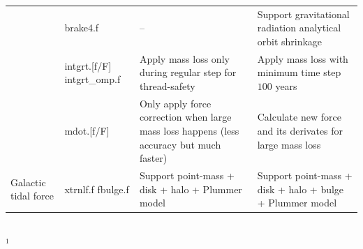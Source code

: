 \documentclass[usenatbib,aas_macros]{mn2e}
\begin{document}
\begin{table}
\begin{tabular}{p{0.8in}|p{0.8in}|p{2.1in}|p{2.1in}}
                       & brake4.f & -- & Support gravitational radiation analytical orbit shrinkage\\
                       & intgrt.[f/F] intgrt\_omp.f 
                       & Apply mass loss only during regular step for thread-safety
                       & Apply mass loss with minimum time step $100$ years\\
                       & mdot.[f/F] 
                       & Only apply force correction when large mass loss happens (less accuracy but much faster)
                       & Calculate new force and its derivates for large mass loss\\\hline
    Galactic tidal force & xtrnlf.f fbulge.f
                         & Support point-mass + disk + halo + Plummer model 
                         & Support point-mass + disk + halo + bulge + Plummer model\\\hline
  \end{tabular}\\
  $^{1}$ 
\end{table}
\end{document}
